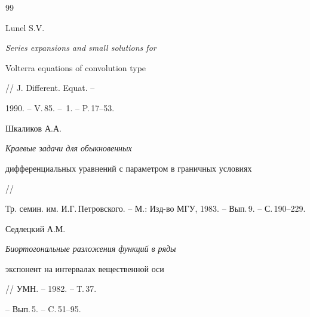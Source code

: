 \begin{thebibliography}{99}


Lunel S.V. {\it Series expansions and small solutions for


Volterra equations of convolution type} // J. Different. Equat. --


1990. -- V.\,85. -- \No\,1. -- P.\,17--53.





 Шкаликов А.А. {\it Краевые задачи для обыкновенных


дифференциальных уравнений  с параметром в граничных условиях} //


Тр. семин. им. И.Г.\,Петровского. -- М.: Изд-во МГУ, 1983. -- Вып.\,9. -- С.\,190--229.







Седлецкий А.М. {\it Биортогональные разложения функций в ряды


экспонент на интервалах вещественной оси} // УМН. -- 1982. -- Т.\,37.


-- Вып.\,5. -- C.\,51--95.








\end{thebibliography}





\vskip 2cm












\label{end}





